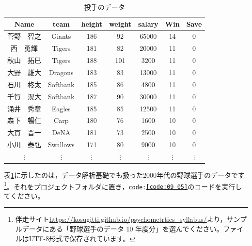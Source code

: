 \documentclass{ltjsbook}
\begin{document}
\begin{table}[ht]
	\caption{投手のデータ}
	\centering
	\begin{tabular}[t]{ccccccc}
		\hline
		Name     & team     & height   & weight   & salary   & Win      & Save     \\
		\hline
		菅野　智之    & Giants   & 186      & 92       & 65000    & 14       & 0        \\
		西　勇輝     & Tigers   & 181      & 82       & 20000    & 11       & 0        \\
		秋山　拓巳    & Tigers   & 188      & 101      & 3200     & 11       & 0        \\
		大野　雄大    & Dragons  & 183      & 83       & 13000    & 11       & 0        \\
		石川　柊太    & Softbank & 185      & 86       & 4800     & 11       & 0        \\
		千賀　滉大    & Softbank & 187      & 90       & 30000    & 11       & 0        \\
		涌井　秀章    & Eagles   & 185      & 85       & 12500    & 11       & 0        \\
		森下　暢仁    & Carp     & 180      & 76       & 1600     & 10       & 0        \\
		大貫　晋一    & DeNA     & 181      & 73       & 2500     & 10       & 0        \\
		小川　泰弘    & Swallows & 171      & 80       & 9000     & 10       & 0        \\
		$\vdots$ & $\vdots$ & $\vdots$ & $\vdots$ & $\vdots$ & $\vdots$ & $\vdots$ \\
		\hline
	\end{tabular}
	\label{tbl::09_01}
\end{table}

表\ref{tbl::09_01}に示したのは，データ解析基礎でも扱った2000年代の野球選手のデータです\footnote{伴走サイト\url{https://kosugitti.github.io/psychometrtics_syllabus/}より，サンプルデータにある「野球選手のデータ 10 年度分」を選んでください。ファイルはUTF-8形式で保存されています。}。それをプロジェクトフォルダに置き，\texttt{code:\ref{code:09_05}}のコードを実行してください。
\end{document}
